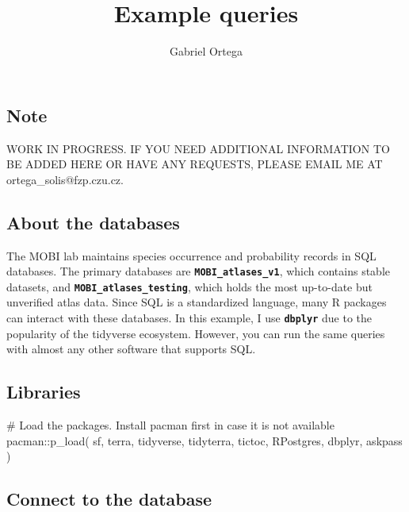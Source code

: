 \documentclass[
  letterpaper,
  DIV=11,
  numbers=noendperiod]{scrartcl}
\title{Example queries}
\author{Gabriel Ortega}
\date{}
\newenvironment{Shaded}{\begin{snugshade}}{\end{snugshade}}
\newcommand{\CommentTok}[1]{\textcolor[rgb]{0.37,0.37,0.37}{#1}}
\newcommand{\FunctionTok}[1]{\textcolor[rgb]{0.28,0.35,0.67}{#1}}
\newcommand{\NormalTok}[1]{\textcolor[rgb]{0.00,0.23,0.31}{#1}}
\newcommand{\SpecialCharTok}[1]{\textcolor[rgb]{0.37,0.37,0.37}{#1}}
\renewcommand*\contentsname{Table of contents}
\newcommand\contentsname{Table of contents}
\begin{document}
\maketitle

\renewcommand*\contentsname{Table of contents}
{
\hypersetup{linkcolor=}
\setcounter{tocdepth}{3}
\tableofcontents
}

\subsection{Note}\label{note}

WORK IN PROGRESS. IF YOU NEED ADDITIONAL INFORMATION TO BE ADDED HERE OR
HAVE ANY REQUESTS, PLEASE EMAIL ME AT ortega\_solis@fzp.czu.cz.

\subsection{About the databases}\label{about-the-databases}

The MOBI lab maintains species occurrence and probability records in SQL
databases. The primary databases are
\textbf{\texttt{MOBI\_atlases\_v1}}, which contains stable datasets, and
\textbf{\texttt{MOBI\_atlases\_testing}}, which holds the most
up-to-date but unverified atlas data. Since SQL is a standardized
language, many R packages can interact with these databases. In this
example, I use \textbf{\texttt{dbplyr}} due to the popularity of the
tidyverse ecosystem. However, you can run the same queries with almost
any other software that supports SQL.

\subsection{Libraries}\label{libraries}

\begin{Shaded}
\begin{Highlighting}[]
\CommentTok{\# Load the packages. Install pacman first in case it is not available}
\NormalTok{pacman}\SpecialCharTok{::}\FunctionTok{p\_load}\NormalTok{(}
\NormalTok{  sf, terra, tidyverse, tidyterra, tictoc, RPostgres, dbplyr, askpass}
\NormalTok{)}
\end{Highlighting}
\end{Shaded}

\subsection{Connect to the database}\label{connect-to-the-database}
\end{document}

